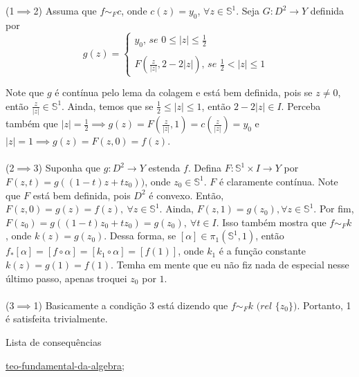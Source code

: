 \begin{dem}
(1$ \implies $2)
    Assuma que $f \sim_F c$, onde $c(z) = y_0$, $\forall z \in \mathbb{S}^1$. Seja $G:D^2 \rightarrow Y$ definida por
   $$g(z) =\begin{cases}
        y_0\textit{, se } 0 \leq |z| \leq \frac{1}{2} &\\
        \\
        F(\frac{z}{|z|}, 2 - 2|z|)\textit{, se } \frac{1}{2} < |z| \leq 1

        
    \end{cases}$$

Note que $g$ é contínua pelo lema da colagem e está bem definida, pois se $z \neq 0$, então $\frac{z}{|z|} \in \mathbb{S}^1$. Ainda, temos que se $\frac{1}{2} \leq |z| \leq 1$, então $2 - 2|z| \in I$. Perceba também que $|z| = \frac{1}{2} \implies g(z) = F(\frac{z}{|z|}, 1) = c(\frac{z}{|z|}) = y_0$ e $|z| = 1 \implies g(z) = F(z, 0) = f(z)$. \\
\\
(2$\implies$3) Suponha que $g:D^2 \rightarrow Y$ estenda $f$. Defina $F:\mathbb{S}^1\times I \rightarrow Y$ por $F(z, t) = g((1 - t)z + tz_0))$, onde $z_0 \in \mathbb{S}^1$. $F$ é claramente contínua. Note que $F$ está bem definida, pois $D^2$ é convexo. Então, $F(z, 0) = g(z) = f(z), \ \forall z \in \mathbb{S}^1$. Ainda, $F(z, 1) = g(z_0), \forall z \in \mathbb{S}^1$. Por fim, $F(z_0) = g((1 - t)z_0 + tz_0) = g(z_0), \ \forall t \in I$. Isso também mostra que $f \sim_F k$, onde $k(z) = g(z_0)$. Dessa forma, se $[\alpha] \in \pi_1(\mathbb{S}^1, 1)$, então $f_*[\alpha] = [f\circ\alpha] = [k_1\circ\alpha] = [f(1)]$, onde $k_1$ é a função constante $k(z) = g(1) = f(1)$. Temha em mente que eu não fiz nada de especial nesse último passo, apenas troquei $z_0$ por $1$.\\
\\
(3$\implies$1) Basicamente a condição 3 está dizendo que $f \sim_F k \textit{ (rel $\{z_0\}$)}$. Portanto, 1 é satisfeita trivialmente.
    
\end{dem}

\begin{titlemize}{Lista de consequências}
	\item \hyperref[teo-fundamental-da-algebra]{teo-fundamental-da-algebra};
\end{titlemize}












